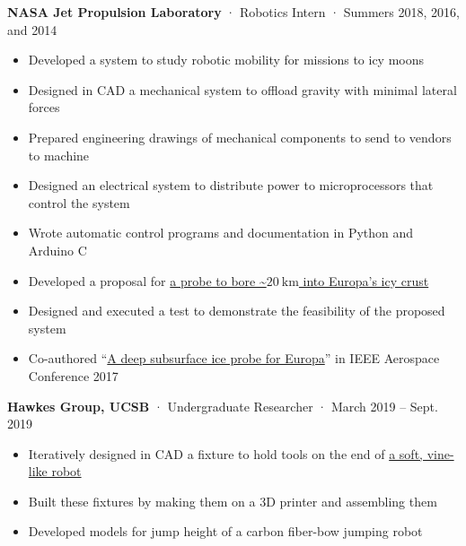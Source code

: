 \documentclass[12pt, oneside]{article}
\newcommand{\jobtitle}[3] {
	{\bf #1} · {#2} · {#3} \vspace{-7pt} \\
}
\begin{document}
\begin{flushleft}
\jobtitle{NASA Jet Propulsion Laboratory}{Robotics Intern}{Summers 2018, 2016, and 2014}
\begin{itemize}
	\item Developed a system to study robotic mobility for missions to icy moons \\
	\item Designed in CAD a mechanical system to offload gravity with minimal lateral forces \\
	\item Prepared engineering drawings of mechanical components to send to vendors to machine \\
	\item Designed an electrical system to distribute power to microprocessors that control the system \\
	\item Wrote automatic control programs and documentation in Python and Arduino C \\
	\item Developed a proposal for \href{https://portfolium.com/entry/owms-deep-subsurface-access-level-wind}{a probe to bore \textasciitilde$\SI{20}{\kilo\meter}$ into Europa's icy crust} \\
	\item Designed and executed a test to demonstrate the feasibility of the proposed system \\
	\item Co-authored ``\href{https://www.researchgate.net/publication/317702124_A_deep_subsurface_ice_probe_for_Europa}{A deep subsurface ice probe for Europa}'' in IEEE Aerospace Conference 2017 \\
\end{itemize}

\jobtitle{Hawkes Group, UCSB}{Undergraduate Researcher}{March 2019 – Sept. 2019}
\begin{itemize}
	\item Iteratively designed in CAD a fixture to hold tools on the end of \href{https://portfolium.com/entry/vine-robot-tool-mount}{a soft, vine-like robot} \\
	\item Built these fixtures by making them on a 3D printer and assembling them \\
	\item Developed models for jump height of a carbon fiber-bow jumping robot
\end{itemize}


\end{flushleft}
\end{document}
